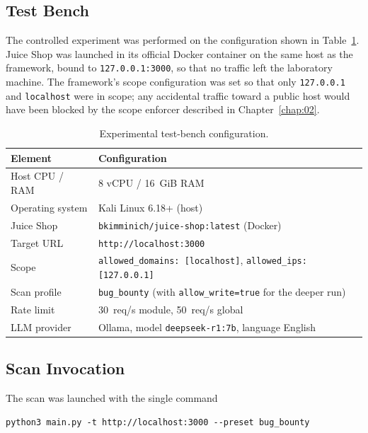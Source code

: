 \subsection{Test Bench}
\label{sec:bench}

The controlled experiment was performed on the configuration shown in Table~\ref{tab:bench}. Juice Shop was launched in its official Docker container on the same host as the framework, bound to \texttt{127.0.0.1:3000}, so that no traffic left the laboratory machine. The framework's scope configuration was set so that only \texttt{127.0.0.1} and \texttt{localhost} were in scope; any accidental traffic toward a public host would have been blocked by the scope enforcer described in Chapter~\ref{chap:02}.

\begin{table}[h]
\centering
\small
\begin{tabular}{|l|l|}
\hline
\textbf{Element} & \textbf{Configuration} \\
\hline
Host CPU / RAM        & 8 vCPU / 16~GiB RAM \\
Operating system      & Kali Linux 6.18+ (host) \\
Juice Shop            & \texttt{bkimminich/juice-shop:latest} (Docker) \\
Target URL            & \texttt{http://localhost:3000} \\
Scope                 & \texttt{allowed\_domains: [localhost]}, \texttt{allowed\_ips: [127.0.0.1]} \\
Scan profile          & \texttt{bug\_bounty} (with \texttt{allow\_write=true} for the deeper run) \\
Rate limit            & 30~req/s module, 50~req/s global \\
LLM provider          & Ollama, model \texttt{deepseek-r1:7b}, language English \\
\hline
\end{tabular}
\caption{Experimental test-bench configuration.}
\label{tab:bench}
\end{table}

\subsection{Scan Invocation}

The scan was launched with the single command

\begin{lstlisting}[basicstyle=\ttfamily\small]
python3 main.py -t http://localhost:3000 --preset bug_bounty
\end{lstlisting}

